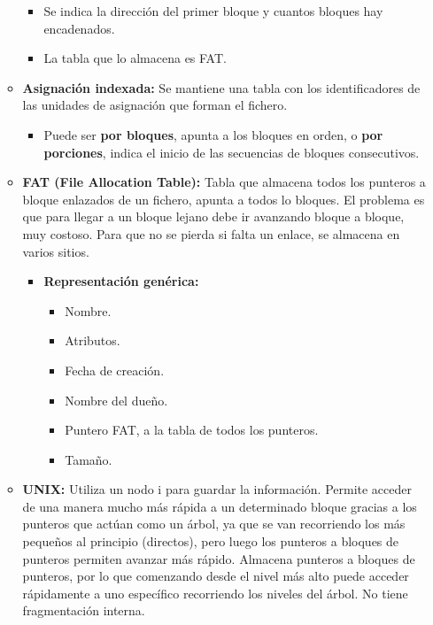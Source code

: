 \documentclass[12pt, twoside, openright]{report} %
\begin{document}
\begin{itemize}
\begin{itemize}
      \begin{itemize}
      \item Se indica la dirección del primer bloque y cuantos bloques hay
        encadenados.
        
      \item La tabla que lo almacena es FAT.
        
      \end{itemize}
    \item \textbf{Asignación indexada:} Se mantiene una tabla con los
      identificadores de las unidades de asignación que forman el
      fichero.
      

      \begin{itemize}
      \item Puede ser \textbf{por bloques}, apunta a los bloques en orden, o
        \textbf{por porciones}, indica el inicio de las secuencias de
        bloques consecutivos.
        
      \end{itemize}
    \item \textbf{FAT (File Allocation Table):} Tabla que almacena todos los
      punteros a bloque enlazados de un fichero, apunta a todos lo
      bloques. El problema es que para llegar a un bloque lejano debe ir
      avanzando bloque a bloque, muy costoso. Para que no se pierda si
      falta un enlace, se almacena en varios sitios.
      

      \begin{itemize}
      \item \textbf{Representación genérica:}
        

        \begin{itemize}
        \item Nombre.
          
        \item Atributos.
          
        \item Fecha de creación.
          
        \item Nombre del dueño.
          
        \item Puntero FAT, a la tabla de todos los punteros.
          
        \item Tamaño.
          
        \end{itemize}
      \end{itemize}
    \item \textbf{UNIX:} Utiliza un nodo i para guardar la información.
      Permite acceder de una manera mucho más rápida a un determinado
      bloque gracias a los punteros que actúan como un árbol, ya que se
      van recorriendo los más pequeños al principio (directos), pero
      luego los punteros a bloques de punteros permiten avanzar más
      rápido. Almacena punteros a bloques de punteros, por lo que
      comenzando desde el nivel más alto puede acceder rápidamente a uno
      específico recorriendo los niveles del árbol. No tiene
      fragmentación interna.
      

\end{itemize}
\end{itemize}
\end{document}
